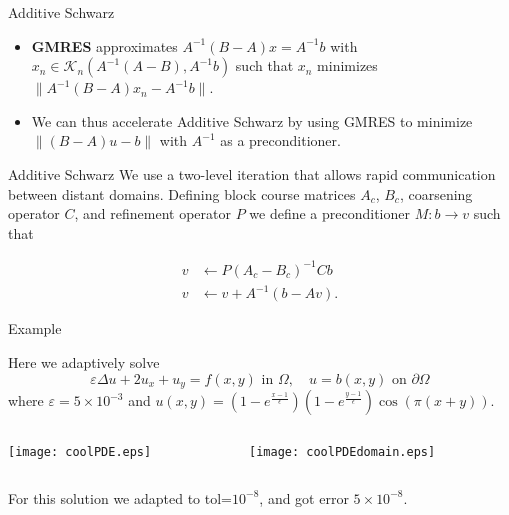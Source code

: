 \documentclass{beamer}
\begin{document}
\begin{frame}{Additive Schwarz}
\begin{itemize}
		\item \textbf{GMRES} approximates $A^{-1}(B-A)x = A^{-1} b$ with $x_n \in \mathcal{K}_n(A^{-1}(A-B), A^{-1}b)$ such that $x_n$ minimizes $\| A^{-1}(B-A)x_n - A^{-1} b \|$.
		\item We can thus accelerate Additive Schwarz by using GMRES to minimize $\|(B-A)u-b\|$ with $A^{-1}$ as a preconditioner.
\end{itemize}
\end{frame}

\begin{frame}{Additive Schwarz}
We use a two-level iteration that allows rapid communication between distant domains. Defining block course matrices $A_c$, $B_c$, coarsening operator $C$, and refinement operator $P$ we define a preconditioner $M:b\rightarrow v $ such that

\begin{equation*}
\begin{aligned}
	v &\leftarrow P (A_c-B_c)^{-1} C b \\
	v &\leftarrow v + A^{-1}(b-Av).
\end{aligned}
\end{equation*}
\end{frame}

\begin{frame}{Example}

Here we adaptively solve
$$
\varepsilon \Delta u + 2 u_x+u_y = f(x,y) \text{ in } \Omega, \quad u=b(x,y) \text{ on } \partial\Omega
$$
\bigskip
where $\varepsilon=5\times10^{-3}$ and $u(x,y) = \left(1-e^{\frac{x-1}{\epsilon }}\right) \left(1-e^{\frac{y-1}{\epsilon }}\right) \cos (\pi  (x+y)).$
\begin{columns}[t]

\begin{column}{0.5\textwidth}	
\begin{center}
\texttt{[image: coolPDE.eps]}	
\end{center}
\end{column}

\begin{column}{0.5\textwidth}
\begin{center}
\texttt{[image: coolPDEdomain.eps]}	
\end{center}
\end{column}

\end{columns}

\begin{center}
For this solution we adapted to tol=$10^{-8}$, and got error $5 \times 10^{-8}$.
\end{center}

\end{frame}
\end{document}
